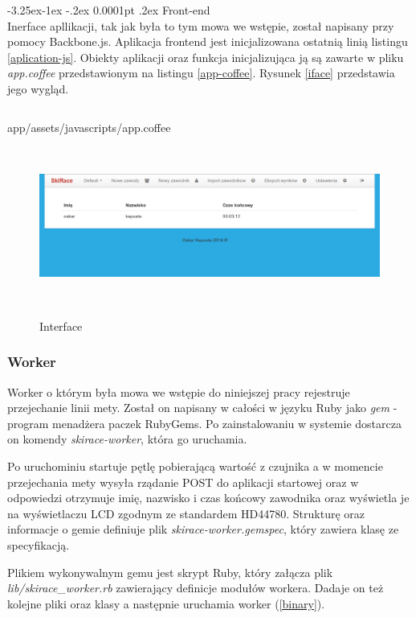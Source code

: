 \documentclass[11pt,a4paper, twoside]{article}
\makeatletter
\renewcommand\paragraph{\@startsection{paragraph}{4}{\z@}%
                                     {-3.25ex\@plus -1ex \@minus -.2ex}%
                                     {0.0001pt \@plus .2ex}%
                                     {\normalfont\normalsize\bfseries}}
\makeatother
\begin{document}
\paragraph{Front-end} ~\\
Inerface apllikacji, tak jak była to tym mowa we wstępie, został napisany przy pomocy Backbone.js. Aplikacja frontend jest inicjalizowana ostatnią linią listingu \ref{aplication-js}. Obiekty aplikacji oraz funkcja inicjalizująca ją są zawarte w pliku \emph{app.coffee} przedstawionym na listingu \ref{app-coffee}. Rysunek \ref{iface} przedstawia jego wygląd.
\begin{listing}[H]
\inputminted{js}{./src/app.coffee}
\caption{app/assets/javascripts/app.coffee}
$\label{app-coffee}$
\end{listing}
\begin{figure}[ht]
\includegraphics[scale=0.35]{./img/interface.png}
\caption{Interface}
$\label{iface}$
\end{figure}
\newpage
\subsubsection{Worker}
Worker o którym była mowa we wstępie do niniejszej pracy rejestruje przejechanie linii mety. Został on napisany w całości w języku Ruby jako \emph{gem} - program menadżera paczek RubyGems. Po zainstalowaniu w systemie dostarcza on komendy \emph{skirace-worker}, która go uruchamia.


Po uruchominiu startuje pętlę pobierającą wartość z czujnika a w momencie przejechania mety wysyła rządanie POST do aplikacji startowej oraz w odpowiedzi otrzymuje imię, nazwisko i czas końcowy zawodnika oraz wyświetla je na wyświetlaczu LCD zgodnym ze standardem HD44780. Strukturę oraz informacje o gemie definiuje plik \emph{skirace-worker.gemspec}, który zawiera klasę ze specyfikacją.

Plikiem wykonywalnym gemu jest skrypt Ruby, który załącza plik \emph{lib/skirace\_worker.rb} zawierający definicje modułów workera. Dadaje on też kolejne pliki oraz klasy a następnie uruchamia worker (\ref{binary}). 
\end{document}
